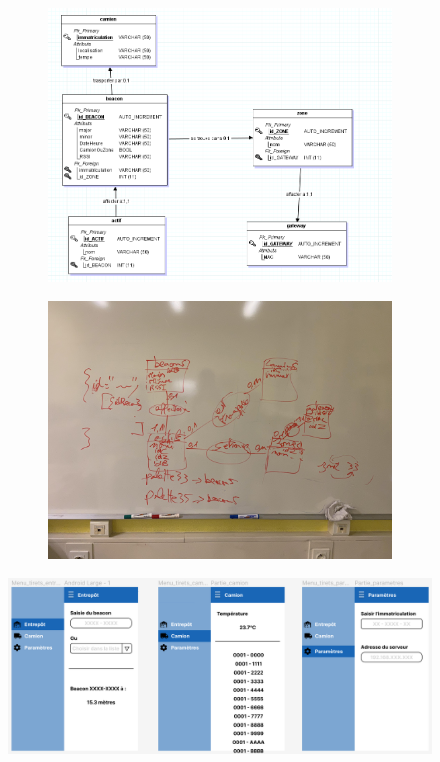 \documentclass[10pt,a4paper]{article}
\begin{document}
\begin{figure}[h!]
    \centering
    \begin{subfigure}[b]{0.45\textwidth}
        \centering
        \includegraphics[scale=0.14]{Images/MLD_proposition_nous.png}
        \caption{}
        \label{MLD_proposition_nous} 
    \end{subfigure}
    \begin{subfigure}[b]{0.45\textwidth}
        \includegraphics[scale=0.14]{Images/MLD_proposition_hacquard.jpg}
        \caption{}
        \label{MLD_proposition_hacquard}
    \end{subfigure}
    \caption{}
\end{figure}

\begin{figure}[h!]
    \centering
    \includegraphics[scale=0.2]{Images/figma_v1.png}
    \caption{}
    \label{figma_v1}
\end{figure}
\end{document}
